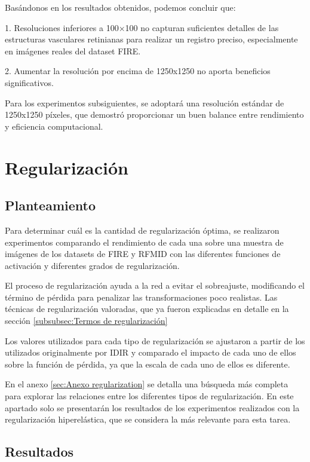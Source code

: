 Basándonos en los resultados obtenidos, podemos concluir que:

1. Resoluciones inferiores a 100×100 no capturan suficientes detalles de las estructuras vasculares retinianas para realizar un registro preciso, especialmente en imágenes reales del dataset FIRE.

2. Aumentar la resolución por encima de 1250x1250 no aporta beneficios significativos.

Para los experimentos subsiguientes, se adoptará una resolución estándar de 1250x1250 píxeles, que demostró proporcionar un buen balance entre rendimiento y eficiencia computacional.

\section{Regularización}
\label{sec:Regularización}

\subsection{Planteamiento}
\label{subsec:Planteamento-regularization}

Para determinar cuál es la cantidad de regularización óptima, se realizaron experimentos comparando el rendimiento de cada una sobre una muestra de imágenes de los datasets de FIRE y RFMID con las diferentes funciones de activación y diferentes grados de regularización.

El proceso de regularización ayuda a la red a evitar el sobreajuste, modificando el término de pérdida para penalizar las transformaciones poco realistas.
Las técnicas de regularización valoradas, que ya fueron explicadas en detalle en la sección \ref{subsubsec:Termos de regularización}

Los valores utilizados para cada tipo de regularización se ajustaron a partir de los utilizados originalmente por IDIR y comparado el impacto de cada uno de ellos sobre la función de pérdida, ya que la escala de cada uno de ellos es diferente.

En el anexo \ref{sec:Anexo regularization} se detalla una búsqueda más completa para explorar las relaciones entre los diferentes tipos de regularización.
En este apartado solo se presentarán los resultados de los experimentos realizados con la regularización hiperelástica, que se considera la más relevante para esta tarea.

\subsection{Resultados}
\label{subsec:Resultados-regularization}

